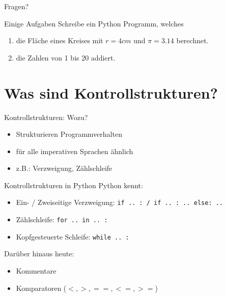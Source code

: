 \begin{frame}
	\huge Fragen?
\end{frame}

\begin{frame}{Einige Aufgaben}
	Schreibe ein Python Programm, welches
	\begin{enumerate}
		\item die Fläche eines Kreises mit $r=4cm$ und $\pi = 3.14$ berechnet.
		\item die Zahlen von 1 bis 20 addiert.
	\end{enumerate}
\end{frame}

\section{Was sind Kontrollstrukturen?}
\begin{frame}{Kontrollstrukturen: Wozu?}
    \begin{itemize}
        \item Strukturieren Programmverhalten
        \item für alle imperativen Sprachen ähnlich
        \item z.B.: Verzweigung, Zählschleife
    \end{itemize}
\end{frame}



\begin{frame}{Kontrollstrukturen in Python}
    Python kennt:
    \begin{itemize}
        \item Ein- / Zweiseitige Verzweigung: \texttt{if .. : / if .. : .. else: ..}
        \item Zählschleife: \texttt{for .. in .. :}
        \item Kopfgesteuerte Schleife: \texttt{while .. :}
    \end{itemize}
	\pause
	Darüber hinaus heute:
	\begin{itemize}
		\item Kommentare
		\item Komparatoren ($<,>,==, <=, >=$)
	\end{itemize}
\end{frame}
